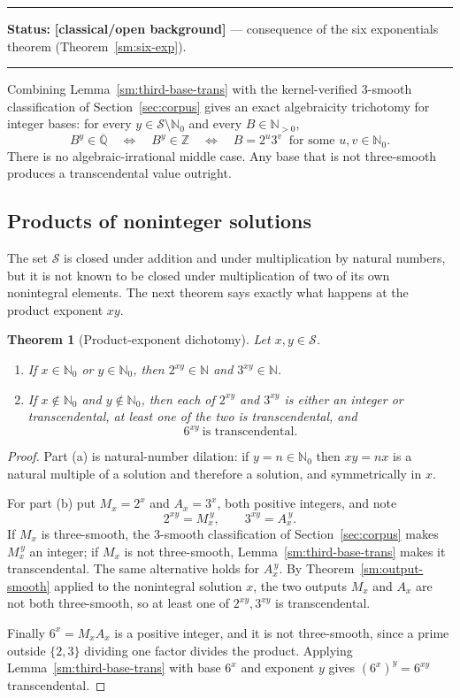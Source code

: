\documentclass[11pt,oneside]{article}
\newtheorem{theorem}{Theorem}[section]
\theoremstyle{definition}
\theoremstyle{remark}
\newcommand{\N}{\mathbb N}
\newcommand{\Nzero}{\mathbb N_0}
\newcommand{\Z}{\mathbb Z}
\newcommand{\Abar}{\overline{\mathbb Q}}
\newcommand{\Sol}{\mathcal S}
\newcommand{\statusknown}{\textcolor{classicalgray}{\textbf{[classical/\allowbreak open background]}}}
\newenvironment{statusbox}[1]
{\begin{center}\begin{minipage}{0.94\textwidth}\raggedright\hbadness=10000\hrule
\vspace{0.45em}\textbf{Status:} #1\par\vspace{0.35em}}
{\vspace{0.35em}\hrule\end{minipage}\end{center}}
\begin{document}
\begin{statusbox}{\statusknown{} --- consequence of the six exponentials theorem
(Theorem~\ref{sm:six-exp}).}
\end{statusbox}

Combining Lemma~\ref{sm:third-base-trans} with the kernel-verified $3$-smooth classification
of Section~\ref{sec:corpus} gives an exact algebraicity trichotomy for integer bases: for
every $y\in\Sol\setminus\Nzero$ and every $B\in\N_{>0}$,
\begin{equation}
 B^y\in\Abar
 \quad\Longleftrightarrow\quad
 B^y\in\Z
 \quad\Longleftrightarrow\quad
 B=2^u3^v\ \text{ for some }u,v\in\Nzero .
 \label{sm:eq-trichotomy}
\end{equation}
There is no algebraic-irrational middle case.  Any base that is not three-smooth produces a
transcendental value outright.

\subsection{Products of noninteger solutions}

The set $\Sol$ is closed under addition and under multiplication by natural numbers, but it
is not known to be closed under multiplication of two of its own nonintegral elements.  The
next theorem says exactly what happens at the product exponent $xy$.

\begin{theorem}[Product-exponent dichotomy]
\label{sm:product-trans}
Let $x,y\in\Sol$.
\begin{enumerate}[label=\textup{(\alph*)}]
\item If $x\in\Nzero$ or $y\in\Nzero$, then $2^{xy}\in\N$ and $3^{xy}\in\N$.
\item If $x\notin\Nzero$ and $y\notin\Nzero$, then each of $2^{xy}$ and $3^{xy}$ is either an
integer or transcendental, at least one of the two is transcendental, and
\[
 6^{xy}\ \text{is transcendental}.
\]
\end{enumerate}
\end{theorem}

\begin{proof}
Part (a) is natural-number dilation: if $y=n\in\Nzero$ then $xy=nx$ is a natural multiple of
a solution and therefore a solution, and symmetrically in $x$.

For part (b) put $M_x=2^x$ and $A_x=3^x$, both positive integers, and note
\[
 2^{xy}=M_x^{\,y},\qquad 3^{xy}=A_x^{\,y}.
\]
If $M_x$ is three-smooth, the $3$-smooth classification of Section~\ref{sec:corpus} makes
$M_x^{\,y}$ an integer; if $M_x$ is not three-smooth, Lemma~\ref{sm:third-base-trans} makes
it transcendental.  The same alternative holds for $A_x^{\,y}$.  By
Theorem~\ref{sm:output-smooth} applied to the nonintegral solution $x$, the two outputs
$M_x$ and $A_x$ are not both three-smooth, so at least one of $2^{xy},3^{xy}$ is
transcendental.

Finally $6^x=M_xA_x$ is a positive integer, and it is not three-smooth, since a prime outside
$\{2,3\}$ dividing one factor divides the product.  Applying
Lemma~\ref{sm:third-base-trans} with base $6^x$ and exponent $y$ gives
$(6^x)^y=6^{xy}$ transcendental.
\end{proof}
\end{document}

